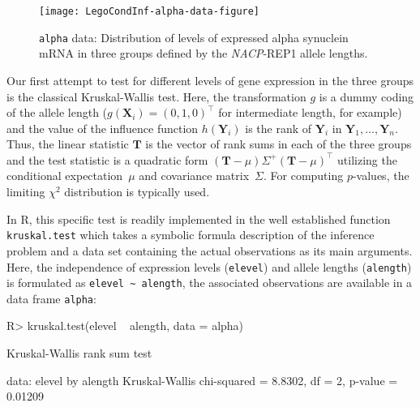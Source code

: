\documentclass{article}
\newcommand{\Robject}[1]{\texttt{#1}}
\newcommand{\Rcmd}[1]{\texttt{#1}}
\newcommand{\RR}{\textsf{R}}
\newcommand{\X}{\mathbf{X}}
\newcommand{\Y}{\mathbf{Y}}
\newcommand{\T}{\mathbf{T}}
\newenvironment{Schunk}{}{}
\begin{document}
\begin{sidewaysfigure}
\begin{center}
\texttt{[image: LegoCondInf-alpha-data-figure]}
\caption{\Robject{alpha} data: Distribution of levels of expressed alpha synuclein mRNA
         in three groups defined by the \textit{NACP}-REP1 allele lengths.
         \label{alpha-box}}
\end{center}
\end{sidewaysfigure}
Our first attempt to test for different levels of gene expression in the three
groups is the classical Kruskal-Wallis test. Here, the transformation 
$g$ is a dummy coding of the allele length ($g(\X_i) = (0, 1, 0)^\top$ for
intermediate length, for example) and the value of the influence function 
$h(\Y_i)$ is the rank of $\Y_i$ in $\Y_1, \dots, \Y_n$.
Thus, the linear statistic $\T$ is the vector of rank sums in each of the 
three groups and the test statistic is a quadratic form 
$(\T - \mu) \Sigma^+ (\T - \mu)^\top$ 
utilizing the conditional expectation~$\mu$ and covariance matrix~$\Sigma$.
For computing $p$-values, the limiting $\chi^2$ distribution is typically used.

In \RR{}, this specific test is readily implemented in the well established
function \Rcmd{kruskal.test} which takes a symbolic formula description of the
inference problem and a data set containing the actual observations as its main
arguments. Here, the independence of expression
levels (\Robject{elevel}) and allele lengths (\Robject{alength}) is   
formulated as \verb|elevel ~ alength|, the associated observations are available
in a data frame \Rcmd{alpha}:
\begin{Schunk}
\begin{Sinput}
R> kruskal.test(elevel ~ alength, data = alpha)
\end{Sinput}
\begin{Soutput}
	Kruskal-Wallis rank sum test

data:  elevel by alength 
Kruskal-Wallis chi-squared = 8.8302, df = 2, p-value =
0.01209
\end{Soutput}
\end{Schunk}
\end{document}

